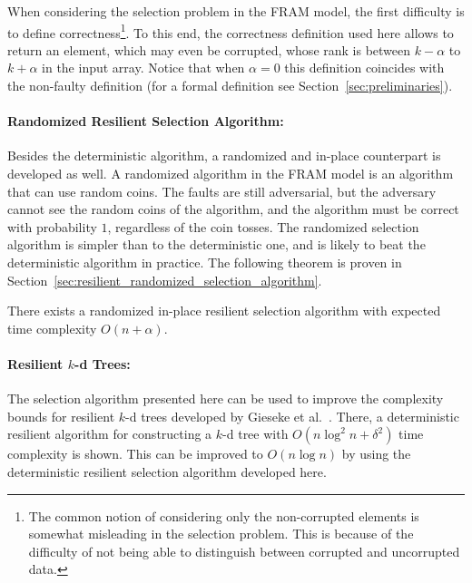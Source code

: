 \documentclass{llncs}
\begin{document}
When considering the selection problem in the FRAM model, the first difficulty is to define correctness\footnote{The common notion of considering only the non-corrupted elements is somewhat misleading in the selection problem. This is because of the difficulty of not being able to distinguish between corrupted and uncorrupted data.}.  To this end, the correctness definition used here allows to return an element, which may even be corrupted, whose rank is between $k-\alpha$ to $k+\alpha$ in the input array. Notice that when $\alpha = 0$ this definition coincides with the non-faulty definition (for a formal definition see Section~\ref{sec:preliminaries}).



\paragraph{Randomized Resilient Selection Algorithm:}

Besides the deterministic algorithm, a randomized and in-place counterpart is developed as well.
A randomized algorithm in the FRAM model is an algorithm that can use random coins. The faults are still adversarial, but the adversary cannot see the random coins of the algorithm, and the algorithm must be correct with probability $1$, regardless of the coin tosses. The randomized selection algorithm is simpler than to the deterministic one, and is likely to beat the deterministic algorithm in practice.
The following theorem is proven in Section~\ref{sec:resilient_randomized_selection_algorithm}.

\begin{theorem}
There exists a randomized in-place resilient selection algorithm with expected time complexity $O(n+\alpha)$.
\end{theorem}




\paragraph{Resilient $k$-d Trees:}

The selection algorithm presented here can be used to improve the complexity bounds for resilient $k$-d trees developed by Gieseke et al.~\cite{kd_trees}. There, a deterministic resilient algorithm for constructing a $k$-d tree with $O(n\log^2 n + \delta^2)$ time complexity is shown. This can be improved to $O(n \log n)$ by using the deterministic resilient selection algorithm developed here.
\end{document}

